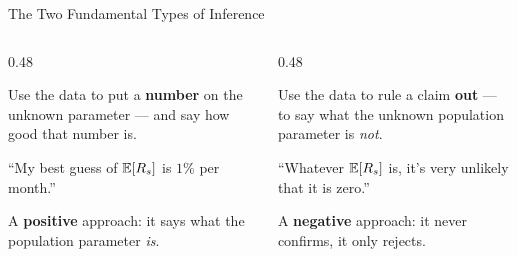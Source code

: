 \documentclass[9pt,english,aspectratio=169]{beamer}
\begin{document}
\begin{frame}{The Two Fundamental Types of Inference}

  \begin{columns}[T]
    \begin{column}{0.48\textwidth}
      \begin{definitionbox}[Estimation]
        Use the data to put a \textbf{number} on the unknown parameter --- and
        say how good that number is.
      \end{definitionbox}

      \vspace{0.4em}
      {\small ``My best guess of $\mathbb{E}[R_s]$ is $1\%$ per month.''}

      \vspace{0.6em}
      \begin{insightbox}
        A \textbf{positive} approach: it says what the population parameter \emph{is}.
      \end{insightbox}
    \end{column}
    \pause
    \begin{column}{0.48\textwidth}
      \begin{definitionbox}
        Use the data to rule a claim \textbf{out} --- to say what the unknown population parameter is \emph{not}.
      \end{definitionbox}

      \vspace{0.4em}
      {\small ``Whatever $\mathbb{E}[R_s]$ is, it's very unlikely that it is zero.''}

      \vspace{0.6em}
      \begin{insightbox}
        A \textbf{negative} approach: it never confirms, it only rejects. 
      \end{insightbox}
    \end{column}
  \end{columns}


\end{frame}

\end{document}
